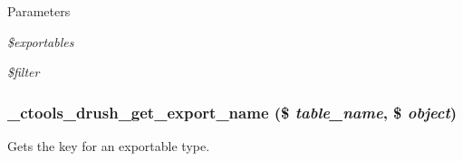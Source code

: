 \begin{DoxyParams}{Parameters}
\item[{\em \$exportables}]\item[{\em \$filter}]\end{DoxyParams}
\hypertarget{ctools_8drush_8inc_a6bf2e880260509b600562786eb63c79f}{
\subsubsection[{\_\-ctools\_\-drush\_\-get\_\-export\_\-name}]{\setlength{\rightskip}{0pt plus 5cm}\_\-ctools\_\-drush\_\-get\_\-export\_\-name (\$ {\em table\_\-name}, \/  \$ {\em object})}}
\label{ctools_8drush_8inc_a6bf2e880260509b600562786eb63c79f}
Gets the key for an exportable type.


